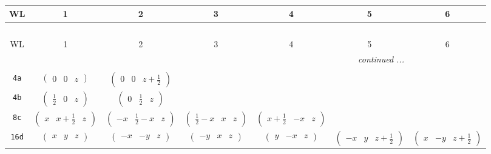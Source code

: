\documentclass[fleqn,9pt,landscape]{jsarticle}
\begin{document}
\begin{center}
\renewcommand{\arraystretch}{1.2}
\begin{longtable}{ccccccc}
 \hline \hline
WL & 1 & 2 & 3 & 4 & 5 & 6 \\ \hline \endfirsthead

\multicolumn{6}{l}{\tablename\ \thetable{}} \\
 \hline \hline
WL & 1 & 2 & 3 & 4 & 5 & 6 \\ \hline \endhead

 \hline \hline
\multicolumn{6}{r}{\footnotesize\it continued ...} \\ \endfoot

 \hline \hline
\multicolumn{6}{r}{} \\ \endlastfoot

{\tt 4a} & $ \begin{pmatrix} 0 & 0 & z \end{pmatrix} $ & $ \begin{pmatrix} 0 & 0 & z + \frac{1}{2} \end{pmatrix} $ & $  $ & $  $ & $  $ & $  $ \\ \hline
{\tt 4b} & $ \begin{pmatrix} \frac{1}{2} & 0 & z \end{pmatrix} $ & $ \begin{pmatrix} 0 & \frac{1}{2} & z \end{pmatrix} $ & $  $ & $  $ & $  $ & $  $ \\ \hline
{\tt 8c} & $ \begin{pmatrix} x & x + \frac{1}{2} & z \end{pmatrix} $ & $ \begin{pmatrix} - x & \frac{1}{2} - x & z \end{pmatrix} $ & $ \begin{pmatrix} \frac{1}{2} - x & x & z \end{pmatrix} $ & $ \begin{pmatrix} x + \frac{1}{2} & - x & z \end{pmatrix} $ & $  $ & $  $ \\ \hline
{\tt 16d} & $ \begin{pmatrix} x & y & z \end{pmatrix} $ & $ \begin{pmatrix} - x & - y & z \end{pmatrix} $ & $ \begin{pmatrix} - y & x & z \end{pmatrix} $ & $ \begin{pmatrix} y & - x & z \end{pmatrix} $ & $ \begin{pmatrix} - x & y & z + \frac{1}{2} \end{pmatrix} $ & $ \begin{pmatrix} x & - y & z + \frac{1}{2} \end{pmatrix} $ \\

\end{longtable}
\end{center}
\end{document}
